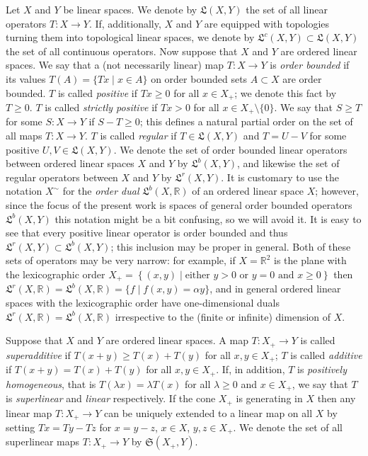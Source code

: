 \documentclass [a4paper, 12pt] {amsart}
\newcommand {\linop} [2] {\ensuremath{\mathfrak L (#1, #2)}}
\newcommand {\suplinop} [2] {\ensuremath{\mathfrak S (#1, #2)}}
\newcommand {\blinop} [2] {\ensuremath{\mathfrak L^b (#1, #2)}}
\newcommand {\orderdual} [1] {\ensuremath{{#1}^{\sim}}}
\newcommand {\rlinop} [2] {\ensuremath{\mathfrak L^r (#1, #2)}}
\newcommand {\clinop} [2] {\ensuremath{\mathfrak L^c (#1, #2)}}
\begin{document}
Let $X$ and $Y$ be linear spaces.  We denote by $\linop {X} {Y}$ the set of all linear operators $T : X \to Y$.
If, additionally,
$X$ and $Y$ are equipped with topologies turning them into topological linear spaces,
we denote by $\clinop {X} {Y} \subset \linop {X} {Y}$ the set of all continuous operators.
Now suppose that $X$ and $Y$ are ordered linear spaces.
We say that a (not necessarily linear) map
$T : X \to Y$ is \emph {order bounded} if its values $T (A) = \{ T x \mid x \in A \}$ on order bounded sets $A \subset X$ are
order bounded.
$T$ is called \emph {positive} if $T x \geqslant 0$ for all $x \in X_+$; we denote this fact by $T \geqslant 0$.
$T$ is called \emph {strictly positive} if $T x > 0$ for all $x \in X_+ \setminus \{0\}$.
We say that $S \geqslant T$ for some $S : X \to Y$ if $S - T \geqslant 0$; this defines a natural partial order
on the set of all maps $T : X \to Y$.
$T$ is called \emph {regular} if $T \in \linop {X} {Y}$ and
$T = U - V$ for some positive $U, V \in \linop {X} {Y}$.
We denote the set of order bounded linear operators between ordered linear spaces $X$ and $Y$ by $\blinop {X} {Y}$,
and likewise the set of regular operators between $X$ and $Y$ by $\rlinop {X} {Y}$.
It is customary to use the notation $\orderdual {X}$ for the \emph {order dual} $\blinop {X} {\mathbb R}$ of an ordered linear space $X$;
however, since the focus of the present work is spaces of general order bounded operators
$\blinop {X} {Y}$
this notation might be a bit confusing, so we will avoid it.
It is easy to see that every positive linear operator is order bounded
and thus $\rlinop {X} {Y} \subset \blinop {X} {Y}$; this inclusion may be proper in general.
Both of these sets of operators may be very narrow: for example, if $X = \mathbb R^2$ is the plane with the lexicographic
order $X_+ = \left\{ (x, y) \mid \text {either $y > 0$ or $y = 0$ and $x \geqslant 0$} \right\}$
then $\rlinop {X} {\mathbb R} = \blinop {X} {\mathbb R} = \{f \mid f (x, y) = \alpha y \}$, and in general
ordered linear spaces with the lexicographic order have one-dimensional duals $\rlinop {X} {\mathbb R} = \blinop {X} {\mathbb R}$ irrespective to
the (finite or infinite) dimension of $X$.

Suppose that $X$ and $Y$ are ordered linear spaces.  A map $T : X_+ \to Y$ is called \emph {superadditive}
if $T (x + y) \geqslant T (x) + T (y)$ for all $x, y \in X_+$; $T$ is called \emph {additive} if
$T (x + y) = T (x) + T (y)$ for all $x, y \in X_+$.  If, in addition, $T$ is \emph {positively homogeneous},
that is $T (\lambda x) = \lambda T (x)$ for all $\lambda \geqslant 0$ and $x \in X_+$, we say that $T$ is
\emph {superlinear} and \emph {linear} respectively.
If the cone $X_+$ is generating in $X$ then any linear map $T : X_+ \to Y$
can be uniquely extended to a linear map on all $X$ by setting $T x = T y - T z$ for $x = y - z$, $x \in X$, $y, z \in X_+$.
We denote the set of all superlinear maps $T : X_+ \to Y$ by \suplinop {X_+} {Y}.
\end{document}
